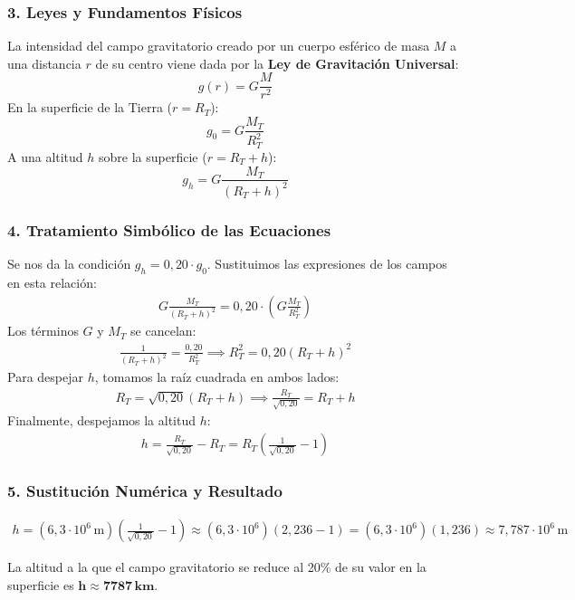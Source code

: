 \subsubsection*{3. Leyes y Fundamentos Físicos}
La intensidad del campo gravitatorio creado por un cuerpo esférico de masa $M$ a una distancia $r$ de su centro viene dada por la \textbf{Ley de Gravitación Universal}:
$$ g(r) = G \frac{M}{r^2} $$
En la superficie de la Tierra ($r = R_T$):
$$ g_0 = G \frac{M_T}{R_T^2} $$
A una altitud $h$ sobre la superficie ($r = R_T + h$):
$$ g_h = G \frac{M_T}{(R_T+h)^2} $$

\subsubsection*{4. Tratamiento Simbólico de las Ecuaciones}
Se nos da la condición $g_h = 0,20 \cdot g_0$. Sustituimos las expresiones de los campos en esta relación:
\begin{gather}
    G \frac{M_T}{(R_T+h)^2} = 0,20 \cdot \left(G \frac{M_T}{R_T^2}\right)
\end{gather}
Los términos $G$ y $M_T$ se cancelan:
\begin{gather}
    \frac{1}{(R_T+h)^2} = \frac{0,20}{R_T^2} \implies R_T^2 = 0,20 (R_T+h)^2
\end{gather}
Para despejar $h$, tomamos la raíz cuadrada en ambos lados:
\begin{gather}
    R_T = \sqrt{0,20} (R_T+h) \implies \frac{R_T}{\sqrt{0,20}} = R_T+h
\end{gather}
Finalmente, despejamos la altitud $h$:
\begin{gather}
    h = \frac{R_T}{\sqrt{0,20}} - R_T = R_T \left( \frac{1}{\sqrt{0,20}} - 1 \right)
\end{gather}

\subsubsection*{5. Sustitución Numérica y Resultado}
\begin{gather}
    h = (6,3 \cdot 10^6 \, \text{m}) \left( \frac{1}{\sqrt{0,20}} - 1 \right) \approx (6,3 \cdot 10^6) (2,236 - 1) = (6,3 \cdot 10^6)(1,236) \approx 7,787 \cdot 10^6 \, \text{m}
\end{gather}
\begin{cajaresultado}
    La altitud a la que el campo gravitatorio se reduce al 20\% de su valor en la superficie es $\boldsymbol{h \approx 7787 \, \textbf{km}}$.
\end{cajaresultado}

